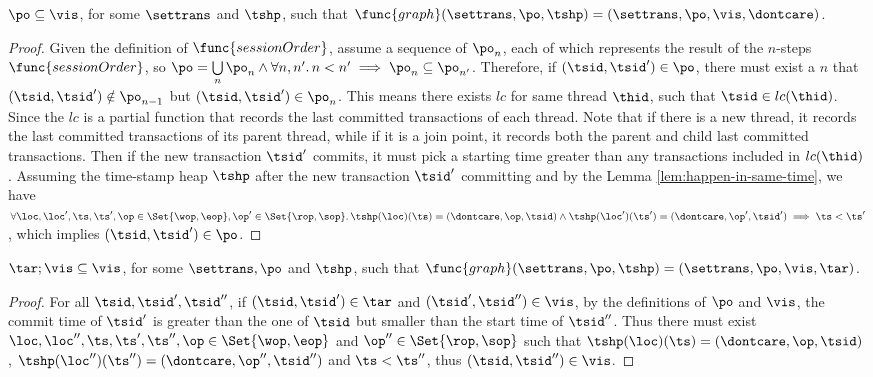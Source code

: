 \begin{lem}[Session]
    \( \po \subseteq \vis \), for some \( \settrans \) and \( \tshp\), such that \( \func{graph}(\settrans,\po,\tshp) = (\settrans,\po,\vis,\dontcare ) \).
\end{lem}   
\begin{proof}
    Given the definition of \( \func{sessionOrder} \), assume a sequence of \( \po_n \), each of which represents the result of the \( n \)-steps \(\func{sessionOrder} \), so \( \po = \bigcup\limits_{n} \po_n \land \forall n, n' \ldotp n < n' \implies \po_n \subseteq \po_{n'} \).
    Therefore, if \( ( \tsid , \tsid' ) \in \po \), there must exist a \( n \) that \( ( \tsid , \tsid' ) \notin \po_{n-1} \) but \( ( \tsid , \tsid' ) \in \po_{n} \).
    This means there exists \( lc \) for same thread \( \thid \), such that \( \tsid \in lc(\thid) \).
    Since the \( lc \) is a partial function that records the last committed transactions of each thread.
    Note that if there is a new thread, it records the last committed transactions of its parent thread, while if it is a join point, it records both the parent and child last committed transactions.
    Then if the new transaction \( \tsid' \) commits, it must pick a starting time greater than any transactions included in \( lc(\thid) \).
    Assuming the time-stamp heap \( \tshp \) after the new transaction \( \tsid' \) committing and by the Lemma \ref{lem:happen-in-same-time}, we have \( \forall \loc, \loc', \ts, \ts', \op \in \Set{\wop,\eop}, \op' \in \Set{\rop,\sop} \ldotp \tshp(\loc)(\ts) = (\dontcare, \op, \tsid) \land \tshp(\loc')(\ts') = (\dontcare, \op', \tsid') \implies \ts < \ts' \), which implies \( (\tsid, \tsid') \in \po \).
\end{proof}

\begin{lem}[prefix]
    \label{lem:prefix}
    \( \tar; \vis \subseteq \vis \), for some \( \settrans, \po \) and \( \tshp\), such that \( \func{graph}(\settrans,\po,\tshp) = (\settrans,\po,\vis,\tar ) \).
\end{lem}
\begin{proof}
    For all \( \tsid, \tsid', \tsid'' \), if \( (\tsid, \tsid') \in \tar \) and \( (\tsid', \tsid'') \in \vis \), by the definitions of \( \po \) and \( \vis \), the commit time of \( \tsid' \) is greater than the one of \( \tsid \) but smaller than the start time of \( \tsid'' \).
    Thus there must exist \( \loc, \loc'', \ts, \ts' , \ts'', \op \in \Set{\wop, \eop}  \) and \( \op'' \in \Set{\rop, \sop } \) such that  \( \tshp(\loc)(\ts) = (\dontcare, \op, \tsid) \), \( \tshp(\loc'')(\ts'') = (\dontcare, \op'', \tsid'') \) and \( \ts < \ts'' \), thus \( ( \tsid, \tsid'' ) \in \vis \).
\end{proof}

